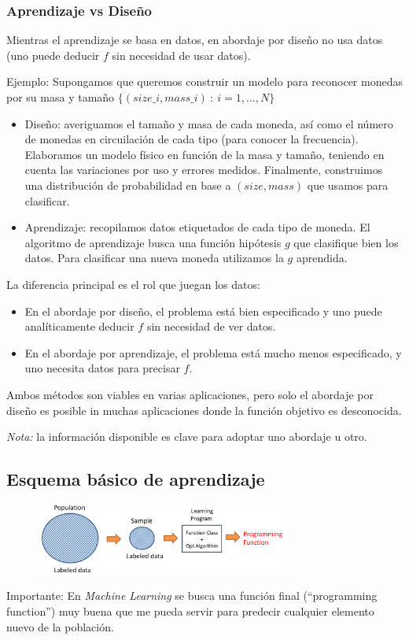 \documentclass[11pt,a4paper]{article}
\theoremstyle{definition}
\begin{document}
	\subsubsection{Aprendizaje vs Diseño}
		Mientras el aprendizaje se basa en datos, en abordaje por diseño no usa datos (uno puede deducir $f$ sin necesidad de usar datos).
		
		 Ejemplo: Supongamos que queremos construir un modelo para reconocer monedas por su masa y tamaño $\{(size\_i,mass\_i) \ : \ i=1,...,N\}$
		 
		 \begin{itemize}
		 	\item Diseño: averiguamos el tamaño y masa de cada moneda, así como el número de monedas en circuilación de cada tipo (para conocer la frecuencia). Elaboramos un modelo físico en función de la masa y tamaño,   teniendo en cuenta las variaciones por uso y errores medidos. Finalmente, construimos una distribución de probabilidad en base a $(size, mass)$ que usamos para clasificar.
		 	
		 	\item Aprendizaje: recopilamos datos etiquetados de cada tipo de moneda. El algoritmo de aprendizaje busca una función hipótesis $g$ que clasifique bien los datos. Para clasificar una nueva moneda utilizamos la $g$ aprendida.
		 \end{itemize}
		
		La diferencia principal es el rol que juegan los datos:
		\begin{itemize}
			\item En el abordaje por diseño, el problema está bien especificado y uno puede analíticamente deducir $f$ sin necesidad de ver datos.
			\item En el abordaje por aprendizaje, el problema está mucho menos especificado, y uno necesita datos para precisar $f$.
		\end{itemize}
		Ambos métodos son viables en varias aplicaciones, pero solo el abordaje por diseño es posible in muchas aplicaciones donde la función objetivo es desconocida.
		
		\textit{Nota:} la información disponible es clave para adoptar uno abordaje u otro.
		
	\subsection{Esquema básico de aprendizaje}
	
	\begin{figure}[h!]
	\centering
	\includegraphics[width=0.75\textwidth]{images/learning_sketch}
	\end{figure}
	Importante: En \textit{Machine Learning} se busca una función final (``programming function'') muy buena que me pueda servir para predecir cualquier elemento nuevo de la población.
	
\end{document}
